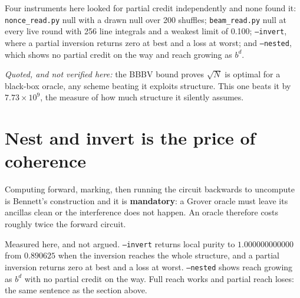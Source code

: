 Four instruments here looked for partial credit independently and none found it:
\texttt{nonce\_read.py} null with a drawn null over 200 shuffles; \texttt{beam\_read.py} null at
every live round with 256 line integrals and a weakest limit of 0.100; \texttt{--invert}, where a
partial inversion returns zero at best and a loss at worst; and \texttt{--nested}, which shows no
partial credit on the way and reach growing as \(b^d\).

\emph{Quoted, and not verified here:} the BBBV bound proves \(\sqrt{N}\) is optimal for a black-box
oracle, any scheme beating it exploits structure. This one beats it by \(7.73 \times 10^{9}\),
the measure of how much structure it silently assumes.

\section{Nest and invert is the price of coherence}

Computing forward, marking, then running the circuit backwards to uncompute is Bennett's
construction and it is \textbf{mandatory}: a Grover oracle must leave its ancillas clean or the
interference does not happen. An oracle therefore costs roughly twice the forward circuit.

Measured here, and not argued. \texttt{--invert} returns local purity to \(1.000000000000\) from
\(0.890625\) when the inversion reaches the whole structure, and a partial inversion returns zero at
best and a loss at worst. \texttt{--nested} shows reach growing as \(b^d\) with no partial credit on
the way. Full reach works and partial reach loses: the same sentence as the section above.
